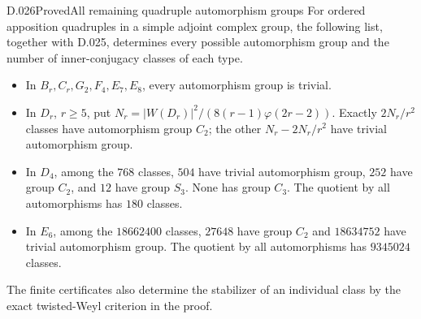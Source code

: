 \begin{saresult}{D.026}{Proved}{All remaining quadruple automorphism groups}
For ordered apposition quadruples in a simple adjoint complex group,
the following list, together with D.025, determines every possible
automorphism group and the number of inner-conjugacy classes of each type.
\begin{itemize}
\item In $B_r,C_r,G_2,F_4,E_7,E_8$, every automorphism group is trivial.
\item In $D_r$, $r\ge5$, put
$N_r=|W(D_r)|^2/(8(r-1)\varphi(2r-2))$.
Exactly $2N_r/r^2$ classes have automorphism group $C_2$;
the other $N_r-2N_r/r^2$ have trivial automorphism group.
\item In $D_4$, among the $768$ classes, $504$ have trivial
automorphism group, $252$ have group $C_2$, and $12$ have group $S_3$.
None has group $C_3$.  The quotient by all automorphisms has $180$ classes.
\item In $E_6$, among the $18662400$ classes, $27648$ have group
$C_2$ and $18634752$ have trivial automorphism group.
The quotient by all automorphisms has $9345024$ classes.
\end{itemize}
The finite certificates also determine the stabilizer of an individual
class by the exact twisted-Weyl criterion in the proof.
\end{saresult}

